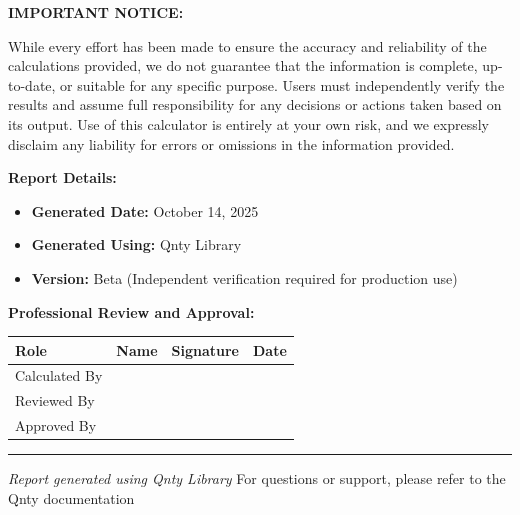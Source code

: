 \documentclass[11pt,a4paper]{article}
\begin{document}
\noindent\textbf{IMPORTANT NOTICE:}

\noindent While every effort has been made to ensure the accuracy and reliability of the calculations provided, we do not guarantee that the information is complete, up-to-date, or suitable for any specific purpose. Users must independently verify the results and assume full responsibility for any decisions or actions taken based on its output. Use of this calculator is entirely at your own risk, and we expressly disclaim any liability for errors or omissions in the information provided.

\vspace{1em}

\noindent\textbf{Report Details:}
\begin{itemize}
\item \textbf{Generated Date:} October 14, 2025
\item \textbf{Generated Using:} Qnty Library
\item \textbf{Version:} Beta (Independent verification required for production use)
\end{itemize}

\vspace{2em}

\noindent\textbf{Professional Review and Approval:}

\vspace{1em}

\begin{longtable}{|p{3cm}|p{4cm}|p{4cm}|p{2.5cm}|}
\hline
\textbf{Role} & \textbf{Name} & \textbf{Signature} & \textbf{Date} \\
\hline
\hline
Calculated By & \rule{0pt}{1.5cm} & & \\
\hline
Reviewed By & \rule{0pt}{1.5cm} & & \\
\hline
Approved By & \rule{0pt}{1.5cm} & & \\
\hline
\end{longtable}

\vspace{1em}

\begin{center}
\rule{\textwidth}{0.4pt}
\vspace{0.5em}
\textit{Report generated using Qnty Library}
\vspace{0.5em}
{\footnotesize For questions or support, please refer to the Qnty documentation}
\end{center}
\end{document}
